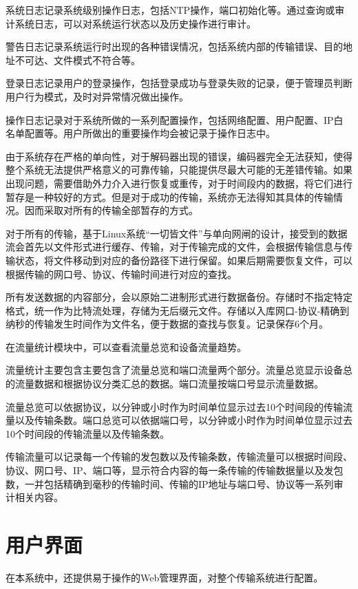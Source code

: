 系统日志记录系统级别操作日志，包括NTP操作，端口初始化等。通过查询或审计系统日志，可以对系统运行状态以及历史操作进行审计。

警告日志记录系统运行时出现的各种错误情况，包括系统内部的传输错误、目的地址不可达、文件模式不符合等。

登录日志记录用户的登录操作，包括登录成功与登录失败的记录，便于管理员判断用户行为模式，及时对异常情况做出操作。

操作日志记录对于系统所做的一系列配置操作，包括网络配置、用户配置、IP白名单配置等。用户所做出的重要操作均会被记录于操作日志中。

由于系统存在严格的单向性，对于解码器出现的错误，编码器完全无法获知，使得整个系统无法提供严格意义的可靠传输，只能提供尽最大可能的无差错传输。如果出现问题，需要借助外力介入进行恢复或重传，对于时间段内的数据，将它们进行暂存是一种较好的方式。但是对于成功的传输，系统亦无法得知其具体的传输情况。因而采取对所有的传输全部暂存的方式。

对于所有的传输，基于Linux系统“一切皆文件”与单向网闸的设计，接受到的数据流会首先以文件形式进行缓存、传输，对于传输完成的文件，会根据传输信息与传输状态，将文件移动到对应的备份路径下进行保留。如果后期需要恢复文件，可以根据传输的网口号、协议、传输时间进行对应的查找。

所有发送数据的内容部分，会以原始二进制形式进行数据备份。存储时不指定特定格式，统一作为比特流处理，存储为无后缀元文件。存储以入库网口-协议-精确到纳秒的传输发生时间作为文件名，便于数据的查找与恢复。记录保存6个月。

在流量统计模块中，可以查看流量总览和设备流量趋势。

流量统计主要包含主要包含了流量总览和端口流量两个部分。流量总览显示设备总的流量数据和根据协议分类汇总的数据。端口流量按端口号显示流量数据。

流量总览可以依据协议，以分钟或小时作为时间单位显示过去10个时间段的传输流量以及传输条数。端口总览可以依据端口号，以分钟或小时作为时间单位显示过去10个时间段的传输流量以及传输条数。

传输流量可以记录每一个传输的发包数以及传输条数，传输流量可以根据时间段、协议、网口号、IP、端口等，显示符合内容的每一条传输的传输数据量以及发包数，一并包括精确到毫秒的传输时间、传输的IP地址与端口号、协议等一系列审计相关内容。

\section{用户界面}

在本系统中，还提供易于操作的Web管理界面，对整个传输系统进行配置。

